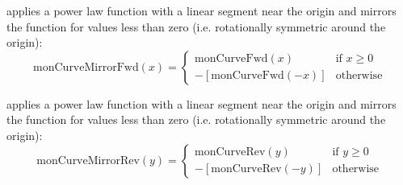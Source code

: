 \begin{xmlfields}
\begin{xmlfields}
			\xmlitemd["monCurveMirrorFwd"] applies a power law function with a linear segment near the origin and mirrors the function for values less than zero (i.e. rotationally symmetric around the origin):
				\begin{equation} \label{eq:expmonCurveMirrorFwd}
					\text{monCurveMirrorFwd}(x) = 
					    \begin{cases}
                            \text{monCurveFwd}(x) & \text{if } x \geq 0 \\[8pt]
					        -[\text{monCurveFwd}(-x)] & \text{otherwise}
					    \end{cases}
				\end{equation}
            
            \xmlitemd["monCurveMirrorRev"] applies a power law function with a linear segment near the origin and mirrors the function for values less than zero (i.e. rotationally symmetric around the origin):
				\begin{equation} \label{eq:expmonCurveMirrorRev}
					\text{monCurveMirrorRev}(y) = 
					    \begin{cases}
                            \text{monCurveRev}(y) & \text{if } y \geq 0 \\[8pt]
					        -[\text{monCurveRev}(-y)] & \text{otherwise}
					    \end{cases}
				\end{equation}		
			
			\end{xmlfields}
\end{xmlfields}
			

